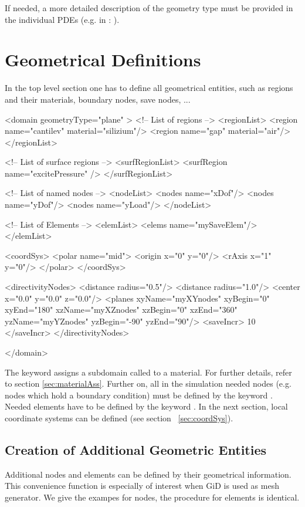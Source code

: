 If needed, a more detailed description of the geometry type must be
provided in the individual PDEs (e.g. in : ).





\section{Geometrical Definitions}
\label{sec:geometricDef}
In the top level section  one has to define all
geometrical entities, such as regions and their materials, boundary
nodes, save nodes, ...
\begin{xmllisting}
<domain geometryType="plane" >
<!-- List of regions -->
  <regionList>
   <region name="cantilev" material="silizium"/>
   <region name="gap"      material="air"/>
  </regionList>

<!-- List of surface regions -->
  <surfRegionList>
   <surfRegion name="excitePressure" />
  </surfRegionList>


<!-- List of named nodes -->
  <nodeList>
   <nodes  name="xDof"/>
   <nodes  name="yDof"/>
   <nodes  name="yLoad"/>
  </nodeList>

<!-- List of Elements -->
  <elemList>
   <elems name="mySaveElem"/>
  </elemList>

  <coordSys>
     <polar name="mid">
       <origin x="0" y="0"/>
       <rAxis x="1" y="0"/>
     </polar>
  </coordSys>

  <directivityNodes>
    <distance radius="0.5"/>
    <distance radius="1.0"/>
    <center x="0.0" y="0.0" z="0.0"/>
    <planes xyName="myXYnodes" xyBegin="0" xyEnd="180"
            xzName="myXZnodes" xzBegin="0" xzEnd="360" 
            yzName="myYZnodes" yzBegin="-90" yzEnd="90"/>
    <saveIncr> 10 </saveIncr>
  </directivityNodes>

</domain>
\end{xmllisting}

The keyword  assigns a subdomain called  to
a
material. For further details, refer to section \ref{sec:materialAss}. Further
on, all in the simulation needed nodes (e.g. nodes which hold
a boundary condition) must be defined by the keyword .
Needed elements have to be defined by the keyword .
In the next section, local coordinate systems can be defined (see section~
\ref{sec:coordSys}).

\subsection{Creation of Additional Geometric Entities}
Additional nodes and elements can be defined by their geometrical information. This convenience function
is especially of interest when GiD is used as mesh generator. We give the exampes for nodes, the procedure for elements is identical.

